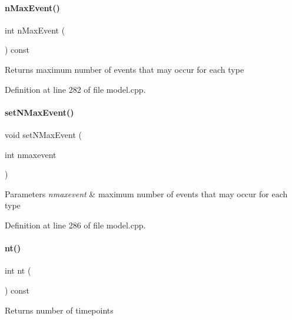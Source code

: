 \paragraph{\texorpdfstring{n\+Max\+Event()}{nMaxEvent()}}
{\footnotesize\ttfamily int n\+Max\+Event (\begin{DoxyParamCaption}{ }\end{DoxyParamCaption}) const}

\begin{DoxyReturn}{Returns}
maximum number of events that may occur for each type 
\end{DoxyReturn}


Definition at line 282 of file model.\+cpp.

\mbox{\label{classamici_1_1_model_a35f06fdd341805405b851788ffe981c4}} 
\paragraph{\texorpdfstring{set\+N\+Max\+Event()}{setNMaxEvent()}}
{\footnotesize\ttfamily void set\+N\+Max\+Event (\begin{DoxyParamCaption}\item[{int}]{nmaxevent }\end{DoxyParamCaption})}


\begin{DoxyParams}{Parameters}
{\em nmaxevent} & maximum number of events that may occur for each type \\
\hline
\end{DoxyParams}


Definition at line 286 of file model.\+cpp.

\mbox{\label{classamici_1_1_model_a4c23d300cbe15b0afb1ee3731d47cc93}} 
\paragraph{\texorpdfstring{nt()}{nt()}}
{\footnotesize\ttfamily int nt (\begin{DoxyParamCaption}{ }\end{DoxyParamCaption}) const}

\begin{DoxyReturn}{Returns}
number of timepoints 
\end{DoxyReturn}


